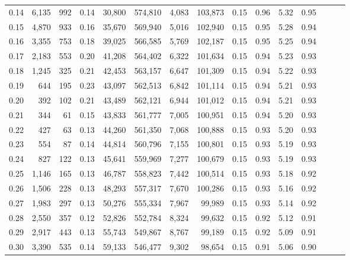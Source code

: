 \begin{tabular}{rrrrrrrrrrrrrrr}
0.14 &    6,135 &     992 &  0.14 &   30,800 &  574,810 &    4,083 &  103,873 &  0.15 &  0.96 &  5.32 &      0.95 \\
0.15 &    4,870 &     933 &  0.16 &   35,670 &  569,940 &    5,016 &  102,940 &  0.15 &  0.95 &  5.28 &      0.94 \\
0.16 &    3,355 &     753 &  0.18 &   39,025 &  566,585 &    5,769 &  102,187 &  0.15 &  0.95 &  5.25 &      0.94 \\
0.17 &    2,183 &     553 &  0.20 &   41,208 &  564,402 &    6,322 &  101,634 &  0.15 &  0.94 &  5.23 &      0.93 \\
0.18 &    1,245 &     325 &  0.21 &   42,453 &  563,157 &    6,647 &  101,309 &  0.15 &  0.94 &  5.22 &      0.93 \\
0.19 &      644 &     195 &  0.23 &   43,097 &  562,513 &    6,842 &  101,114 &  0.15 &  0.94 &  5.21 &      0.93 \\
0.20 &      392 &     102 &  0.21 &   43,489 &  562,121 &    6,944 &  101,012 &  0.15 &  0.94 &  5.21 &      0.93 \\
0.21 &      344 &      61 &  0.15 &   43,833 &  561,777 &    7,005 &  100,951 &  0.15 &  0.94 &  5.20 &      0.93 \\
0.22 &      427 &      63 &  0.13 &   44,260 &  561,350 &    7,068 &  100,888 &  0.15 &  0.93 &  5.20 &      0.93 \\
0.23 &      554 &      87 &  0.14 &   44,814 &  560,796 &    7,155 &  100,801 &  0.15 &  0.93 &  5.19 &      0.93 \\
0.24 &      827 &     122 &  0.13 &   45,641 &  559,969 &    7,277 &  100,679 &  0.15 &  0.93 &  5.19 &      0.93 \\
0.25 &    1,146 &     165 &  0.13 &   46,787 &  558,823 &    7,442 &  100,514 &  0.15 &  0.93 &  5.18 &      0.92 \\
0.26 &    1,506 &     228 &  0.13 &   48,293 &  557,317 &    7,670 &  100,286 &  0.15 &  0.93 &  5.16 &      0.92 \\
0.27 &    1,983 &     297 &  0.13 &   50,276 &  555,334 &    7,967 &   99,989 &  0.15 &  0.93 &  5.14 &      0.92 \\
0.28 &    2,550 &     357 &  0.12 &   52,826 &  552,784 &    8,324 &   99,632 &  0.15 &  0.92 &  5.12 &      0.91 \\
0.29 &    2,917 &     443 &  0.13 &   55,743 &  549,867 &    8,767 &   99,189 &  0.15 &  0.92 &  5.09 &      0.91 \\
0.30 &    3,390 &     535 &  0.14 &   59,133 &  546,477 &    9,302 &   98,654 &  0.15 &  0.91 &  5.06 &      0.90 \\

\end{tabular}
